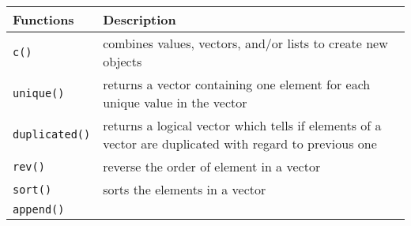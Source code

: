 \documentclass[11pt]{article}
\begin{document}
\begin{longtable}[c]{@{}ll@{}}
\toprule
\begin{minipage}[b]{0.13\columnwidth}\raggedright\strut
Functions
\strut\end{minipage} &
\begin{minipage}[b]{0.81\columnwidth}\raggedright\strut
Description
\strut\end{minipage}\tabularnewline
\midrule
\endhead
\begin{minipage}[t]{0.13\columnwidth}\raggedright\strut
\texttt{c()}
\strut\end{minipage} &
\begin{minipage}[t]{0.81\columnwidth}\raggedright\strut
combines values, vectors, and/or lists to create new objects
\strut\end{minipage}\tabularnewline
\begin{minipage}[t]{0.13\columnwidth}\raggedright\strut
\texttt{unique()}
\strut\end{minipage} &
\begin{minipage}[t]{0.81\columnwidth}\raggedright\strut
returns a vector containing one element for each unique value in the
vector
\strut\end{minipage}\tabularnewline
\begin{minipage}[t]{0.13\columnwidth}\raggedright\strut
\texttt{duplicated()}
\strut\end{minipage} &
\begin{minipage}[t]{0.81\columnwidth}\raggedright\strut
returns a logical vector which tells if elements of a vector are
duplicated with regard to previous one
\strut\end{minipage}\tabularnewline
\begin{minipage}[t]{0.13\columnwidth}\raggedright\strut
\texttt{rev()}
\strut\end{minipage} &
\begin{minipage}[t]{0.81\columnwidth}\raggedright\strut
reverse the order of element in a vector
\strut\end{minipage}\tabularnewline
\begin{minipage}[t]{0.13\columnwidth}\raggedright\strut
\texttt{sort()}
\strut\end{minipage} &
\begin{minipage}[t]{0.81\columnwidth}\raggedright\strut
sorts the elements in a vector
\strut\end{minipage}\tabularnewline
\begin{minipage}[t]{0.13\columnwidth}\raggedright\strut
\texttt{append()}

\end{minipage}
\end{longtable}
\end{document}

